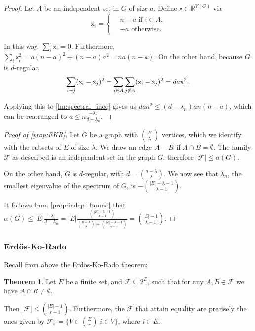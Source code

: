 \documentclass[12pt]{amsart}
\theoremstyle{definition}
\newtheorem{thm}{Theorem}[section]
\newcommand{\R}{\mathbb{R}}
\newcommand{\FF}{\mathcal F}
\newcommand{\vx}{\mathsf{x}}
\begin{document}
\begin{proof}
Let $A$ be an independent set in $G$ of size $a$.
Define $\vx \in \R^{V(G)}$ via 
$$ \vx_i =\begin{cases*}
      & n-a \text{ if $i \in A$,}\\
      & -a \text{ otherwise.}
    \end{cases*} $$

In this way, $\sum_i \vx_i  = 0$.
Furthermore, $\sum_i \vx_i^2 = a(n-a)^2 + (n-a)a^2 = n a (n-a)$.
On the other hand, because $G$ is $d$-regular,
$$ \sum_{i \-- j} (\vx_i - \vx_j)^2 = \sum_{i \in A}\sum_{j \not\in A}(\vx_i - \vx_j)^2 = dan^2\, . $$

Applying this to \cref{lm:spectral_ineq} gives us $dan^2 \leq (d-\lambda_n)an (n-a)$, which can be rearranged to $a \leq n \frac{-\lambda_n}{d - \lambda_n}$.
\end{proof}

\begin{proof}[Proof of \cref{prop:EKR}]
Let $G$ be a graph with $\binom{|E|}{\lambda}$ vertices, which we identify with the subsets of $E$ of size $\lambda$.
We draw an edge $A \-- B$ if $A \cap B = \emptyset $.
The family $\FF $ as described is an independent set in the graph $G$, therefore $|\FF | \leq \alpha (G)$.

On the other hand, $G$ is $d$-regular, with $d = \binom{n - \lambda}{ \lambda}$.
We now see that $\lambda_n$, the smallest eigenvalue of the spectrum of $G$, is $-\binom{|E| - \lambda - 1}{\lambda - 1}$.

It follows from \cref{prop:indep_bound} that $\alpha(G) \leq |E|\frac{-\lambda_n}{d - \lambda_n} = |E|\frac{\binom{|E| - \lambda - 1}{\lambda - 1}}{\binom{n - \lambda}{\lambda} + \binom{|E| - \lambda - 1}{\lambda - 1}} = \binom{|E|-1}{\lambda - 1}$.
\end{proof}

\subsubsection*{Erd\"os-Ko-Rado}

Recall from above the Erd\"os-Ko-Rado theorem:

\begin{thm}\label{thm:EKR}
Let $E$ be a finite set, and $\mathcal F \subseteq 2^E$, such that for any $A, B \in \FF$ we have $A \cap B \neq \emptyset $.

Then $|\FF | \leq \binom{|E|-1}{r-1}$.
Furthermore, the $\FF$ that attain equality are precisely the ones given by $\FF_i \coloneqq \{ V \in \binom{E}{r} | i \in V\}$, where $i \in E$.
\end{thm}
\end{document}
